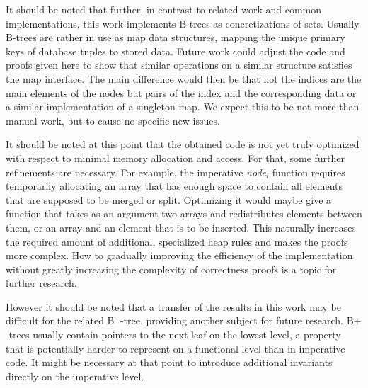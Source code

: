 It should be noted that further,
in contrast to related work and common implementations,
this work implements B-trees as concretizations of sets.
Usually B-trees are rather in use as map data structures,
mapping the unique primary keys
of database tuples to stored data.
Future work could adjust the code and proofs given here
to show that similar operations on a similar structure satisfies
the map interface.
The main difference would then be that not the indices
are the main elements of the nodes but pairs of the 
index and the corresponding data or a similar
implementation of a singleton map.
We expect this to be not more than manual work,
but to cause no specific new issues.

It should be noted at this point that the obtained code is not yet
truly optimized with respect to minimal memory allocation and access.
For that, some further refinements are necessary.
For example, the imperative \textit{node$_i$} function
requires temporarily allocating
an array that has enough space to contain
all elements that are supposed to be merged or split.
Optimizing it would maybe give a function that takes
as an argument two arrays and redistributes elements between them,
or an array and an element that is to be inserted.
This naturally increases the required amount of additional,
specialized heap rules and makes the proofs more complex.
How to gradually improving the efficiency of the implementation
without greatly increasing the complexity of correctness
proofs is a topic for further research.


However it should be noted that a transfer of the results in
this work may be difficult for the related B$^+$-tree,
providing another subject for future research.
B$+$-trees usually contain pointers to the next leaf
on the lowest level, a property that is potentially harder
to represent on a functional level than in imperative code.
It might be necessary at that point to introduce additional
invariants directly on the imperative level.